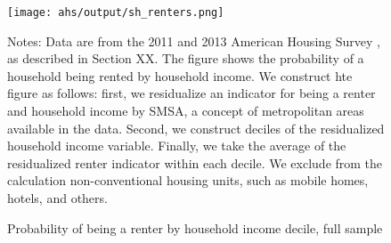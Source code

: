 \begin{figure}[h!]
    \centering
    \caption{Probability of being a renter by household income decile,
             full sample}
    \label{fig:ahs_pr_renters}

    \texttt{[image: ahs/output/sh\_renters.png]}

    \begin{minipage}{.95\textwidth} \footnotesize
        \vspace{3mm}
        Notes: Data are from the 2011 and 2013 American Housing
        Survey \parencite{ahs2020}, as described in 
        Section XX. 
        The figure shows the probability of a household being
        rented by household income. 
        We construct hte figure as follows: first, we residualize an
        indicator for being a renter and household income by SMSA,
        a concept of metropolitan areas available in the data.
        Second, we construct deciles of the residualized household
        income variable.
        Finally, we take the average of the residualized renter 
        indicator within each decile.
        We exclude from the calculation non-conventional housing units, 
        such as mobile homes, hotels, and others.
    \end{minipage}
\end{figure}
